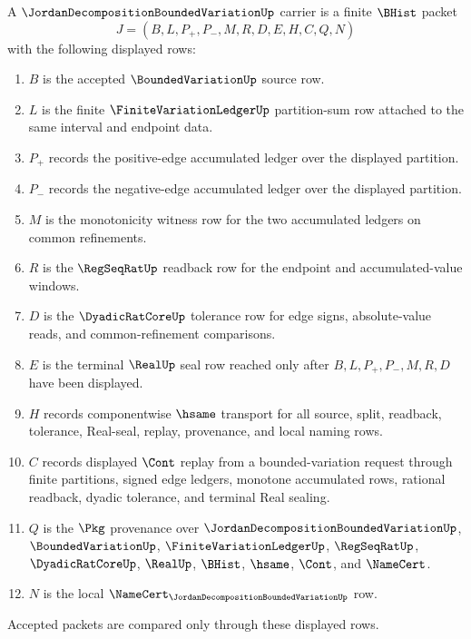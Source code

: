 \begin{definition}
\label{def:jordan-decomposition-bounded-variation-carrier}
A $\JordanDecompositionBoundedVariationUp$ carrier is a finite $\BHist$ packet
$$
J=(B,L,P_{+},P_{-},M,R,D,E,H,C,Q,N)
$$
with the following displayed rows:
\begin{enumerate}
\item $B$ is the accepted $\BoundedVariationUp$ source row.
\item $L$ is the finite $\FiniteVariationLedgerUp$ partition-sum row attached to the same interval and endpoint data.
\item $P_{+}$ records the positive-edge accumulated ledger over the displayed partition.
\item $P_{-}$ records the negative-edge accumulated ledger over the displayed partition.
\item $M$ is the monotonicity witness row for the two accumulated ledgers on common refinements.
\item $R$ is the $\RegSeqRatUp$ readback row for the endpoint and accumulated-value windows.
\item $D$ is the $\DyadicRatCoreUp$ tolerance row for edge signs, absolute-value reads, and common-refinement comparisons.
\item $E$ is the terminal $\RealUp$ seal row reached only after $B,L,P_{+},P_{-},M,R,D$ have been displayed.
\item $H$ records componentwise $\hsame$ transport for all source, split, readback, tolerance, Real-seal, replay, provenance, and local naming rows.
\item $C$ records displayed $\Cont$ replay from a bounded-variation request through finite partitions, signed edge ledgers, monotone accumulated rows, rational readback, dyadic tolerance, and terminal Real sealing.
\item $Q$ is the $\Pkg$ provenance over $\JordanDecompositionBoundedVariationUp$, $\BoundedVariationUp$, $\FiniteVariationLedgerUp$, $\RegSeqRatUp$, $\DyadicRatCoreUp$, $\RealUp$, $\BHist$, $\hsame$, $\Cont$, and $\NameCert$.
\item $N$ is the local $\NameCert_{\JordanDecompositionBoundedVariationUp}$ row.
\end{enumerate}
Accepted packets are compared only through these displayed rows.
\end{definition}

